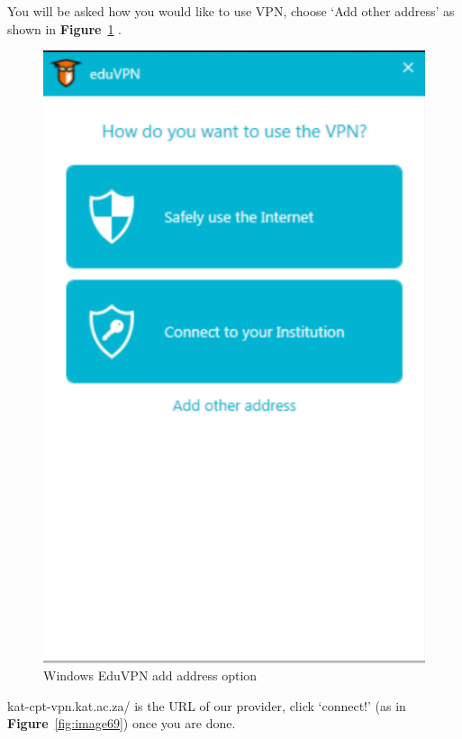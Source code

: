 You will be asked how you would like to use VPN, choose ‘Add other address’ as shown in \textbf{Figure}~\ref{fig:image110} .
\begin{figure}[H]
	\centering
	\includegraphics[scale=0.4]{Chapters/images/image110.png}
	
	\caption{Windows EduVPN add address option}
	\label{fig:image110}
\end{figure}
 kat-cpt-vpn.kat.ac.za/ is the URL of our provider, click ‘connect!’ (as in \textbf{Figure}~\ref{fig:image69}) once you are done. 
